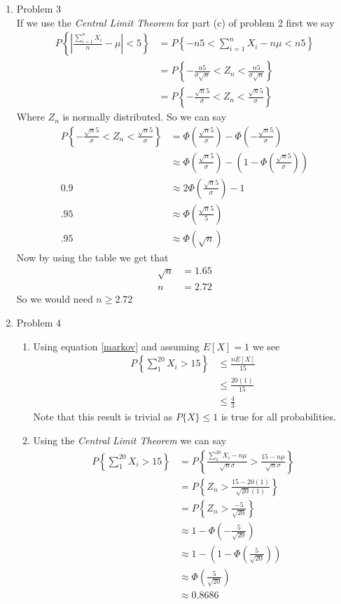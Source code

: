 \documentclass[11pt]{article}
\begin{document}
\begin{enumerate}
\item Problem 3\\
If we use the \emph{Central Limit Theorem} for part (c) of problem 2 first we say 
\begin{align*}
P\left\{\left|\frac{\sum_{i=1}^nX_i}{n}-\mu\right|<5\right\} &= P\left\{-n5<\sum_{i=1}^nX_i-n\mu<n5\right\}\\
&= P\left\{-\frac{n5}{\sigma\sqrt{n}}<Z_n<\frac{n5}{\sigma\sqrt{n}}\right\}\\
&= P\left\{-\frac{\sqrt{n}5}{\sigma}<Z_n<\frac{\sqrt{n}5}{\sigma}\right\}
\end{align*}
Where $Z_n$ is normally distributed. So we can say 
\begin{align*}
P\left\{-\frac{\sqrt{n}5}{\sigma}<Z_n<\frac{\sqrt{n}5}{\sigma}\right\} &= \Phi\left(\frac{\sqrt{n}5}{\sigma}\right)-\Phi\left(-\frac{\sqrt{n}5}{\sigma}\right)\\
&\approx \Phi\left(\frac{\sqrt{n}5}{\sigma}\right)-\left(1 - \Phi\left(\frac{\sqrt{n}5}{\sigma}\right)\right)\\
0.9 &\approx 2\Phi\left(\frac{\sqrt{n}5}{\sigma}\right)-1\\
.95 &\approx \Phi\left(\frac{\sqrt{n}5}{5}\right)\\
.95 &\approx \Phi\left({\sqrt{n}}\right)
\end{align*}
Now by using the table we get that
\begin{align*}
\sqrt{n} &= 1.65\\
n &= 2.72
\end{align*}
So we would need $n\ge2.72$

\item Problem 4
\begin{enumerate}
\item
Using equation \ref{markov} and assuming $E[X]=1$ we see
\begin{align*}
P\left\{\sum_1^{20}X_i>15\right\} &\le \frac{nE[X]}{15}\\
&\le \frac{20(1)}{15}\\
&\le \frac{4}{3}
\end{align*}
Note that this result is trivial as $P\{X\}\le1$ is true for all probabilities.

\item
Using the \emph{Central Limit Theorem} we can say
\begin{align*}
P\left\{\sum_1^{20}X_i>15\right\} &= P\left\{\frac{\sum_1^{20}X_i-n\mu}{\sqrt{n}\sigma}>\frac{15-n\mu}{\sqrt{n}\sigma}\right\}\\
&= P\left\{Z_n>\frac{15-20(1)}{\sqrt{20}(1)}\right\}\\
&= P\left\{Z_n>\frac{-5}{\sqrt{20}}\right\}\\
&\approx 1-\Phi\left(-\frac{5}{\sqrt{20}}\right)\\
&\approx 1-\left(1-\Phi\left(\frac{5}{\sqrt{20}}\right)\right)\\
&\approx \Phi\left(\frac{5}{\sqrt{20}}\right)\\
&\approx 0.8686
\end{align*}
\end{enumerate}


\end{enumerate}
\end{document}

